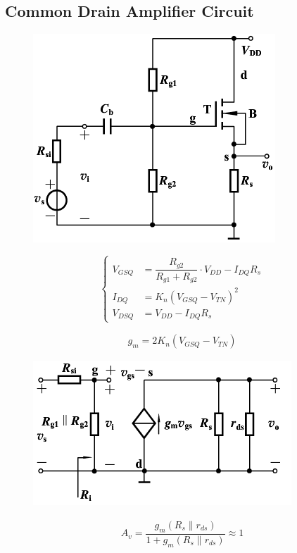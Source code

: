 \subsection{Common Drain Amplifier Circuit}

\begin{figure}[H]
  \centering
  \includegraphics[width=0.5\linewidth]{figures/MOSFET-Common-D}
  \label{fig:}
\end{figure}

\begin{equation*}
  \left\{
  \begin{aligned}
    V_{GSQ} &= \dfrac{R_{g2}}{R_{g1} + R_{g2}} \cdot V_{DD} - I_{DQ} R_s  \\
    I_{DQ} &= K_n \left( V_{GSQ} - V_{TN} \right)^2 \\
    V_{DSQ} &= V_{DD} - I_{DQ} R_s
  \end{aligned}
  \right.
\end{equation*}

\begin{equation*}
  \begin{aligned}
    g_m = 2 K_n \left( V_{GSQ} - V_{TN} \right)
  \end{aligned}
\end{equation*}

\begin{figure}[H]
  \centering
  \includegraphics[width=0.5\linewidth]{figures/MOSFET-Common-Ds}
  \label{fig:}
\end{figure}

\begin{equation*}
  \begin{aligned}
    A_v = \dfrac{g_m \left( R_s \parallel r_{ds} \right)}{1 + g_m \left( R_s \parallel r_{ds} \right)} \approx 1
  \end{aligned}
\end{equation*}

